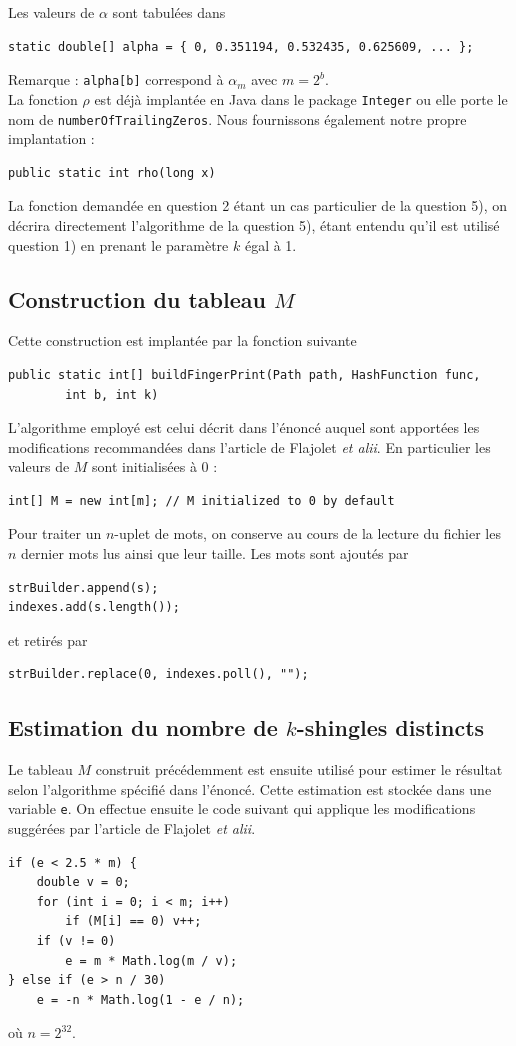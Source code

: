 \documentclass[12pt,a4paper,titlepage]{article}
\newcommand{\class}[1]{\texttt{#1}}
\begin{document}
Les valeurs de $\alpha$ sont tabulées dans 
\begin{lstlisting}
static double[] alpha = { 0, 0.351194, 0.532435, 0.625609, ... };
\end{lstlisting}
Remarque : \class{alpha[b]} correspond à $\alpha_m$ avec $m=2^b$.\\

La fonction $\rho$ est déjà implantée en Java dans le package \class{Integer} ou elle porte le nom de \class{numberOfTrailingZeros}.
Nous fournissons également notre propre implantation :
\begin{lstlisting}
public static int rho(long x)
\end{lstlisting}

La fonction demandée en question 2 étant un cas particulier de la question 5), on décrira directement l'algorithme de la question 5), étant entendu qu'il est utilisé question 1) en prenant le paramètre $k$ égal à 1.

\subsection{Construction du tableau $M$}
Cette construction est implantée par la fonction suivante
\begin{lstlisting}
public static int[] buildFingerPrint(Path path, HashFunction func,
		int b, int k)
\end{lstlisting}
L'algorithme employé est celui décrit dans l'énoncé auquel sont apportées les modifications recommandées dans l'article de Flajolet \textit{et alii}.
En particulier les valeurs de $M$ sont initialisées à $0$ :
\begin{lstlisting}
int[] M = new int[m]; // M initialized to 0 by default
\end{lstlisting}

Pour traiter un $n$-uplet de mots, on conserve au cours de la lecture du fichier les $n$ dernier mots lus ainsi que leur taille.
Les mots sont ajoutés par
\begin{lstlisting}
strBuilder.append(s);
indexes.add(s.length());
\end{lstlisting}
et retirés par
\begin{lstlisting}
strBuilder.replace(0, indexes.poll(), "");
\end{lstlisting}



\subsection{Estimation du nombre de $k$-shingles distincts}
Le tableau $M$ construit précédemment est ensuite utilisé pour estimer le résultat selon l'algorithme spécifié dans l'énoncé. Cette estimation est stockée dans une variable \class{e}. On effectue ensuite le code suivant qui applique les modifications suggérées par l'article de Flajolet \textit{et alii}.
\begin{lstlisting}
if (e < 2.5 * m) {
    double v = 0;
    for (int i = 0; i < m; i++)
    	if (M[i] == 0) v++;
    if (v != 0)
    	e = m * Math.log(m / v);
} else if (e > n / 30)
    e = -n * Math.log(1 - e / n);
\end{lstlisting}
où $n = 2^{32}$.
\end{document}
